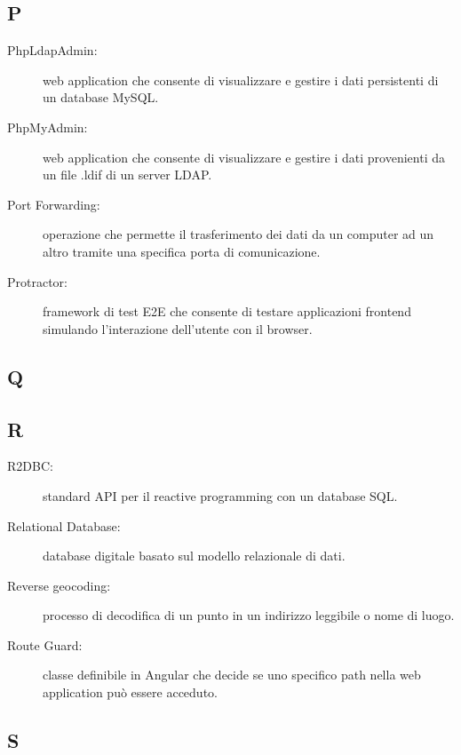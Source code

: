 \documentclass[../manuale-manutentore.tex]{subfiles}
\begin{document}
\subsection{P}

\begin{description}
    \item[PhpLdapAdmin:] web application che consente di visualizzare e gestire i dati persistenti di un database MySQL\@.
    \item[PhpMyAdmin:] web application che consente di visualizzare e gestire i dati provenienti da un file .ldif di un server LDAP\@.
    \item[Port Forwarding:] operazione che permette il trasferimento dei dati da un computer ad un altro tramite una specifica porta di comunicazione.
    \item[Protractor:] framework di test E2E che consente di testare applicazioni frontend simulando l'interazione dell'utente con il browser.
\end{description}

\subsection{Q}

\subsection{R}

\begin{description}
    \item[R2DBC:] standard API per il reactive programming con un database SQL\@.
    \item[Relational Database:] database digitale basato sul modello relazionale di dati.
    \item[Reverse geocoding:] processo di decodifica di un punto in un indirizzo leggibile o nome di luogo.
    \item[Route Guard:] classe definibile in Angular che decide se uno specifico path nella web application può essere acceduto.
\end{description}

\subsection{S}
\end{document}
